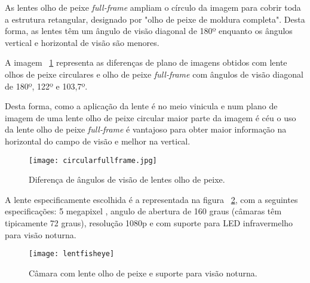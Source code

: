 As lentes olho de peixe \textit{full-frame} ampliam o círculo da imagem para cobrir toda a estrutura retangular, designado por "olho de peixe de moldura completa". Desta forma, as lentes têm um ângulo de visão diagonal de 180º enquanto os ângulos vertical e horizontal de visão são menores. 

A imagem ~\ref{fig:circularfullframe} representa as diferenças de plano de imagens obtidos com lente olhos de peixe circulares e olho de peixe \textit{full-frame} com ângulos de visão diagonal de 180º, 122º e 103,7º. 

Desta forma, como a aplicação da lente é no meio vinicula e num plano de imagem de uma lente olho de peixe circular maior parte da imagem é céu o uso da lente olho de peixe \textit{full-frame} é vantajoso para obter maior informação na horizontal do campo de visão e melhor na vertical.  

\begin{figure}[h!] %
	\begin{center}
		\leavevmode		
		\texttt{[image: circularfullframe.jpg]}
		\caption{Diferença de ângulos de visão de lentes olho de peixe.}
		\label{fig:circularfullframe}
	\end{center}
\end{figure}


A lente especificamente escolhida é a representada na figura ~\ref{fig:lentfisheye}, com a seguintes especificações: 5 megapixel , angulo de abertura de 160 graus (câmaras têm tipicamente 72 graus), resolução 1080p e com suporte para LED infravermelho para visão noturna.

\begin{figure}[h!]%
	\begin{center}
		\leavevmode		
		\texttt{[image: lentfisheye]}
		\caption{Câmara com lente olho de peixe e suporte para visão noturna.}
		\label{fig:lentfisheye}
	\end{center}
\end{figure}
